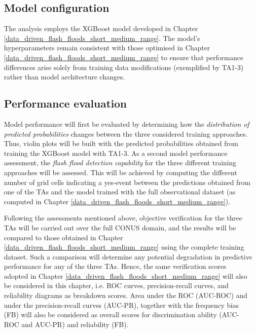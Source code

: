 \subsection{Model configuration}
The analysis employs the XGBoost model developed in Chapter \ref{data_driven_flash_floods_short_medium_range}. The model's hyperparameters remain consistent with those optimised in Chapter \ref{data_driven_flash_floods_short_medium_range} to ensure that performance differences arise solely from training data modifications (exemplified by TA1-3) rather than model architecture changes. 
 
\subsection{Performance evaluation}

Model performance will first be evaluated by determining how the \textit{distribution of predicted probabilities} changes between the three considered training approaches. Thus, violin plots will be built with the predicted probabilities obtained from training the XGBoost model with TA1-3. As a second model performance assessment, the \textit{flash flood detection capability} for the three different training approaches will be assessed. This will be achieved by computing the different number of grid cells indicating a yes-event between the predictions obtained from one of the TAs and the model trained with the full observational dataset (as computed in Chapter \ref{data_driven_flash_floods_short_medium_range}).

Following the assessments mentioned above, objective verification for the three TAs will be carried out over the full CONUS domain, and the results will be compared to those obtained in Chapter \ref{data_driven_flash_floods_short_medium_range} using the complete training dataset. Such a comparison will determine any potential degradation in predictive performance for any of the three TAs. Hence, the same verification scores adopted in Chapter \ref{data_driven_flash_floods_short_medium_range} will also be considered in this chapter, i.e. ROC curves, precision-recall curves, and reliability diagrams as breakdown scores. Area under the ROC (AUC-ROC) and under the precision-recall curves (AUC-PR), together with the frequency bias (FB) will also be considered as overall scores for discrimination ability (AUC-ROC and AUC-PR) and reliability (FB).
 
